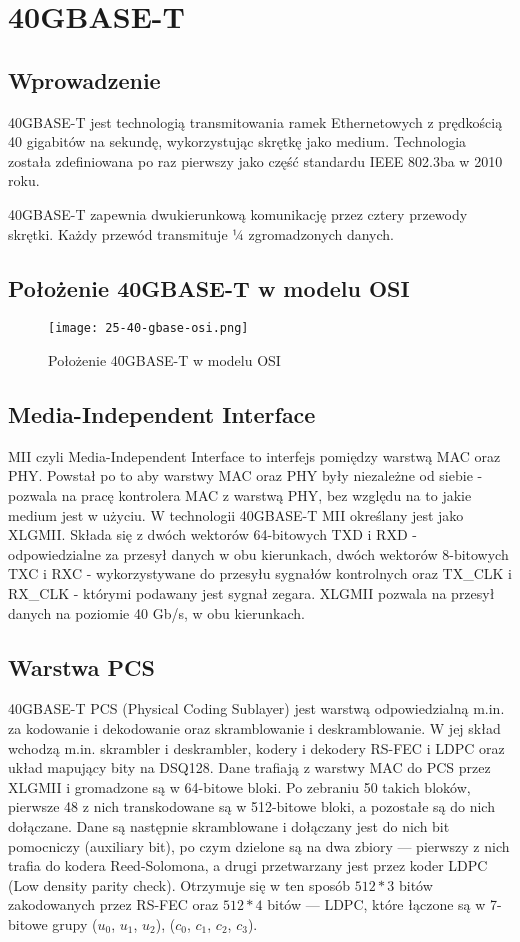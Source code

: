 \section{40GBASE-T}

\subsection{Wprowadzenie}
40GBASE-T jest technologią transmitowania ramek Ethernetowych z prędkością 40 gigabitów na sekundę, wykorzystując skrętkę jako medium. Technologia została zdefiniowana po raz pierwszy jako część standardu IEEE 802.3ba w 2010 roku.

40GBASE-T zapewnia dwukierunkową komunikację przez cztery przewody skrętki. Każdy przewód transmituje ¼ zgromadzonych danych.

\subsection{Położenie 40GBASE-T w modelu OSI}

\begin{figure}[ht]
    \centering
    \texttt{[image: 25-40-gbase-osi.png]}
    \caption{Położenie 40GBASE-T w modelu OSI}
    \label{fig:40gbase-t_osi}
\end{figure}

\subsection{Media-Independent Interface}
MII czyli Media-Independent Interface to interfejs pomiędzy warstwą MAC oraz PHY. Powstał po to aby warstwy MAC oraz PHY były niezależne od siebie - pozwala na pracę kontrolera MAC z warstwą PHY, bez względu na to jakie medium jest w użyciu.
W technologii 40GBASE-T MII określany jest jako XLGMII. Składa się z dwóch wektorów 64-bitowych TXD i RXD - odpowiedzialne za przesył danych w obu kierunkach, dwóch wektorów 8-bitowych TXC i RXC - wykorzystywane do przesyłu sygnałów kontrolnych oraz TX\_CLK i RX\_CLK - którymi podawany jest sygnał zegara. XLGMII pozwala na przesył danych na poziomie 40 Gb/s, w obu kierunkach.

\subsection{Warstwa PCS}\label{subsection:pcs}
40GBASE-T PCS (Physical Coding Sublayer) jest warstwą odpowiedzialną m.in. za kodowanie i dekodowanie oraz skramblowanie i deskramblowanie. W jej skład wchodzą m.in. skrambler i deskrambler, kodery i dekodery RS-FEC i LDPC oraz układ mapujący bity na DSQ128.
Dane trafiają z warstwy MAC do PCS przez XLGMII i gromadzone są w 64-bitowe bloki. Po zebraniu 50 takich bloków, pierwsze 48 z nich transkodowane są w 512-bitowe bloki, a pozostałe są do nich dołączane. Dane są następnie skramblowane i dołączany jest do nich bit pomocniczy (auxiliary bit), po czym dzielone są na dwa zbiory --- pierwszy z nich trafia do kodera Reed-Solomona, a drugi przetwarzany jest przez koder LDPC (Low density parity check). Otrzymuje się w ten sposób $512*3$ bitów zakodowanych przez RS-FEC oraz $512*4$ bitów --- LDPC, które łączone są w 7-bitowe grupy  ($u_0$, $u_1$, $u_2$), ($c_0$, $c_1$, $c_2$, $c_3$).

